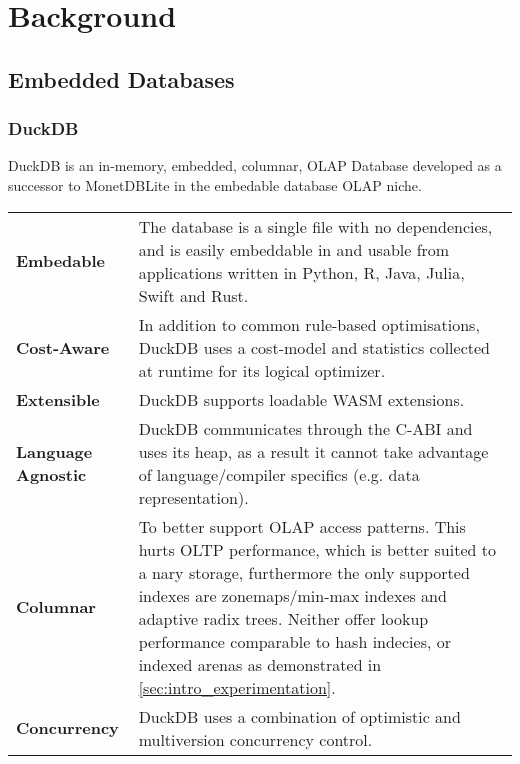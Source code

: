 \chapter{Background}

\section{Embedded Databases}
\subsection{DuckDB}
DuckDB is an in-memory, embedded, columnar, OLAP Database\cite{DuckDBPaper} developed as a successor to MonetDBLite\cite{MonetDBLitePaper} in the embedable database OLAP niche.
\begin{center}
    \begin{tabular}{l p{}}
        \textbf{Embedable}         & The database is a single file with no dependencies, and is easily embeddable in and usable from applications written in Python, R, Java, Julia, Swift and Rust\cite{DuckDBDocs}. \\
        \textbf{Cost-Aware}        & In addition to common rule-based optimisations, DuckDB uses a cost-model and statistics collected at runtime for its logical optimizer.                                          \\
        \textbf{Extensible}        & DuckDB supports loadable WASM extensions.                                                                                                                                        \\
        \textbf{Language Agnostic} & DuckDB communicates through the C-ABI and uses its heap, as a result it cannot take advantage of language/compiler specifics (e.g. data representation).                         \\
        \textbf{Columnar}          & To better support OLAP access patterns. This hurts OLTP performance, which is better suited to a nary storage, furthermore the only supported indexes are zonemaps/min-max
        indexes and adaptive radix trees. Neither offer lookup performance comparable to hash indecies, or indexed arenas as demonstrated in \ref{sec:intro_experimentation}.                                         \\
        \textbf{Concurrency}       & DuckDB uses a combination of optimistic and multiversion concurrency control.                                                                                                    \\
    \end{tabular}
\end{center}
\noindent
